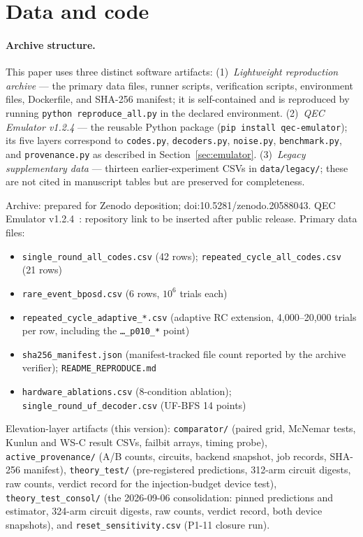 \documentclass[11pt,a4paper]{article}
\begin{document}
\section*{Data and code}

\paragraph{Archive structure.}
This paper uses three distinct software artifacts:
(1)~\emph{Lightweight reproduction archive} --- the primary data files, runner scripts, verification scripts, environment files, Dockerfile, and SHA-256 manifest; it is self-contained and is reproduced by running \texttt{python reproduce\_all.py} in the declared environment.
(2)~\emph{QEC Emulator v1.2.4} --- the reusable Python package (\texttt{pip install qec-emulator});
its five layers correspond to \texttt{codes.py}, \texttt{decoders.py}, \texttt{noise.py},
\texttt{benchmark.py}, and \texttt{provenance.py} as described in Section~\ref{sec:emulator}.
(3)~\emph{Legacy supplementary data} --- thirteen earlier-experiment CSVs
in \texttt{data/legacy/}; these are not cited in manuscript tables but are
preserved for completeness.

Archive: prepared for Zenodo deposition; doi:10.5281/zenodo.20588043.
QEC Emulator v1.2.4~\cite{AlDaajeh2026emulator}: repository link
to be inserted after public release.
Primary data files:
\begin{itemize}[leftmargin=1.4em,itemsep=0pt,topsep=2pt]
  \item \texttt{single\_round\_all\_codes.csv} (42 rows);
        \texttt{repeated\_cycle\_all\_codes.csv} (21 rows)
  \item \texttt{rare\_event\_bposd.csv} (6 rows, $10^{6}$ trials each)
  \item \texttt{repeated\_cycle\_adaptive\_*.csv} (adaptive RC extension,
        4{,}000--20{,}000 trials per row, including the
        \texttt{\dots\_p010\_*} point)
  \item \texttt{sha256\_manifest.json} (manifest-tracked file count
        reported by the archive verifier); \texttt{README\_REPRODUCE.md}
  \item \texttt{hardware\_ablations.csv} (8-condition ablation);
        \texttt{single\_round\_uf\_decoder.csv} (UF-BFS 14 points)
\end{itemize}
Elevation-layer artifacts (this version):
\texttt{comparator/} (paired grid, McNemar tests, Kunlun and WS-C
result CSVs, failbit arrays, timing probe),
\texttt{active\_provenance/} (A/B counts, circuits, backend snapshot,
job records, SHA-256 manifest),
\texttt{theory\_test/} (pre-registered predictions, 312-arm circuit
digests, raw counts, verdict record for the injection-budget device
test), \texttt{theory\_test\_consol/} (the 2026-09-06 consolidation:
pinned predictions and estimator, 324-arm circuit digests, raw counts,
verdict record, both device snapshots), and
\texttt{reset\_sensitivity.csv} (P1-11 closure run).
\end{document}
